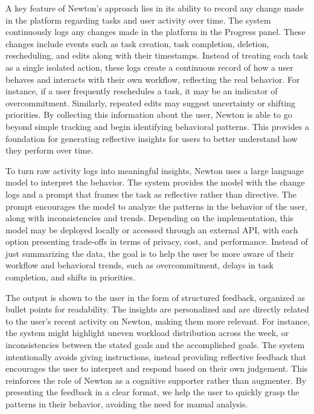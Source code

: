 \documentclass[12pt]{article}
\begin{document}
A key feature of Newton's approach lies in its ability to record any change made in the platform regarding tasks and user activity 
over time. The system continuously logs any changes made in the platform in the Progress panel. These changes include events such as 
task creation, task completion, deletion, rescheduling, and edits along with their timestamps. Instead of treating each task as a 
single isolated action, these logs create a continuous record of how a user behaves and interacts with their own workflow, reflecting
 the real behavior. For instance, if a user frequently reschedules a task, it may be an indicator of overcommitment. Similarly, 
 repeated edits may suggest uncertainty or shifting priorities. By collecting this information about the user, Newton is able to go 
 beyond simple tracking and begin identifying behavioral patterns. This provides a foundation for generating reflective insights for
  users to better understand how they perform over time.


To turn raw activity logs into meaningful insights, Newton uses a large language model to interpret the behavior. The system
 provides the model with the change logs and a prompt that frames the task as reflective rather than directive. The prompt 
 encourages the model to analyze the patterns in the behavior of the user, along with inconsistencies and trends. Depending on 
 the implementation, this model may be deployed locally or accessed through an external API, with each option presenting trade-offs
  in terms of privacy, cost, and performance. Instead of just summarizing the data, the goal is to help the user be more aware of 
  their workflow and behavioral trends, such as overcommitment, delays in task completion, and shifts in priorities.


The output is shown to the user in the form of structured feedback, organized as bullet points for readability. The insights are 
personalized and are directly related to the user's recent activity on Newton, making them more relevant. For instance, the system 
might highlight uneven workload distribution across the week, or inconsistencies between the stated goals and the accomplished goals. 
The system intentionally avoids giving instructions, instead providing reflective feedback that encourages the user to interpret and 
respond based on their own judgement. This reinforces the role of Newton as a cognitive supporter rather than augmenter. By 
presenting the feedback in a clear format, we help the user to quickly grasp the patterns in their behavior, avoiding the need for 
manual analysis.
\end{document}
